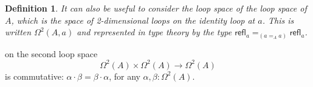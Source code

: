 \documentclass[11pt, a4paper]{article}
\newtheorem{definition}{Definition} \newtheorem{lem}{Lemma}
\newcommand{\refl}[1]{\ensuremath{\mathsf{refl}_{#1}}\xspace}
\newcommand{\id}[3][]{\ensuremath{#2 =_{#1} #3}\xspace}
\begin{document}
\begin{definition} It can also be useful to consider the loop space \emph{of} the loop space of $A$,
which is the space of 2-dimensional loops on the identity loop at $a$. This is
written $\Omega^2(A,a)$ and represented in type theory by the type
$\id[({\id[A]{a}{a}})]{\refl{a}}{\refl{a}}$.
\end {definition}

\begin{thm}%
on the second loop space
  \begin{equation*} \Omega^2(A)\times \Omega^2(A)\to \Omega^2(A)
  \end{equation*} is commutative: $\alpha\cdot\beta = \beta\cdot\alpha$, for any
$\alpha, \beta:\Omega^2(A)$. %
\end{thm}
\end{document}
